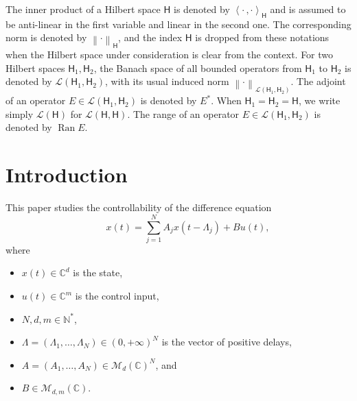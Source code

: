 \documentclass[JEP,XML,SOM,Unicode]{cedram}
\theoremstyle{plain}
\theoremstyle{definition}
\DeclareMathOperator{\range}{Ran}
\newcommand{\norm}[1]{\left\lVert #1\right\lVert}
\newcommand{\scalprod}[2]{\left\langle #1, #2 \right\rangle}
\begin{document}
The inner product of a Hilbert space $\mathsf H$ is denoted by $\scalprod{\cdot\,}{\cdot}_{\mathsf H}$ and is assumed to be anti-linear in the first variable and linear in the second one. The corresponding norm is denoted by $\norm{\cdot}_{\mathsf H}$, and the index $\mathsf H$ is dropped from these notations when the Hilbert space under consideration is clear from the context. For two Hilbert spaces $\mathsf H_1, \mathsf H_2$, the Banach space of all bounded operators from $\mathsf H_1$ to $\mathsf H_2$ is denoted by $\mathcal L(\mathsf H_1, \mathsf H_2)$, with its usual induced norm $\norm{\cdot}_{\mathcal L(\mathsf H_1, \mathsf H_2)}$. The adjoint of an operator $E \in \mathcal L(\mathsf H_1, \mathsf H_2)$ is denoted by $E^\ast$. When $\mathsf H_1 = \mathsf H_2 = \mathsf H$, we write simply $\mathcal L(\mathsf H)$ for $\mathcal L(\mathsf H, \mathsf H)$. The range of an operator $E \in \mathcal L(\mathsf H_1, \mathsf H_2)$ is denoted by $\range E$.

\section{Introduction}
\label{SecIntro}

This paper studies the controllability of the difference equation\vspace*{-3pt}
\begin{equation}
\label{MainSyst}
\qquad x(t) = \sum_{j=1}^N A_j x(t - \Lambda_j) + B u(t),
\end{equation}
where
\begin{itemize}
\item
$x(t) \in \mathbb C^d$ is the state,
\item
$u(t) \in \mathbb C^m$ is the control input,
\item
$N, d, m \in \mathbb N^\ast$,
\item
$\Lambda = (\Lambda_1, \dots, \Lambda_N) \in (0, +\infty)^N$ is the vector of positive delays,
\item
$A = (A_1, \dots, A_N) \in \mathcal M_d(\mathbb C)^N$, and
\item
$B \in \mathcal M_{d, m}(\mathbb C)$.
\end{itemize}
\end{document}
